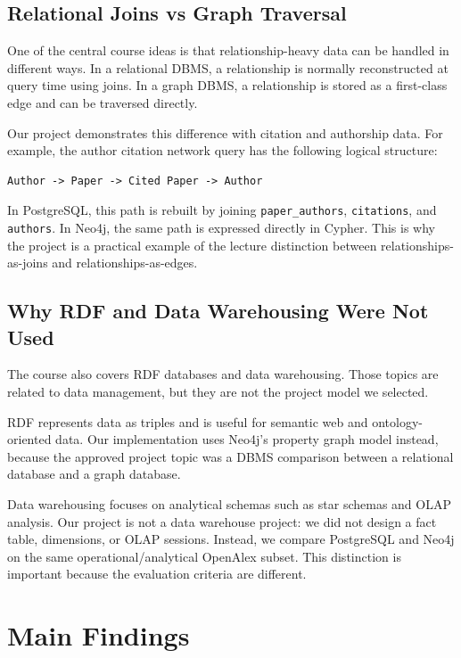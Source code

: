 \documentclass[11pt]{article}
\begin{document}
\subsection{Relational Joins vs Graph Traversal}

One of the central course ideas is that relationship-heavy data can be handled in different ways.
In a relational DBMS, a relationship is normally reconstructed at query time using joins.
In a graph DBMS, a relationship is stored as a first-class edge and can be traversed directly.

Our project demonstrates this difference with citation and authorship data.
For example, the author citation network query has the following logical structure:

\begin{verbatim}
Author -> Paper -> Cited Paper -> Author
\end{verbatim}

In PostgreSQL, this path is rebuilt by joining \texttt{paper\_authors}, \texttt{citations}, and \texttt{authors}.
In Neo4j, the same path is expressed directly in Cypher.
This is why the project is a practical example of the lecture distinction between relationships-as-joins and relationships-as-edges.

\subsection{Why RDF and Data Warehousing Were Not Used}

The course also covers RDF databases and data warehousing.
Those topics are related to data management, but they are not the project model we selected.

RDF represents data as triples and is useful for semantic web and ontology-oriented data.
Our implementation uses Neo4j's property graph model instead, because the approved project topic was a DBMS comparison between a relational database and a graph database.

Data warehousing focuses on analytical schemas such as star schemas and OLAP analysis.
Our project is not a data warehouse project: we did not design a fact table, dimensions, or OLAP sessions.
Instead, we compare PostgreSQL and Neo4j on the same operational/analytical OpenAlex subset.
This distinction is important because the evaluation criteria are different.

\section{Main Findings}
\end{document}
